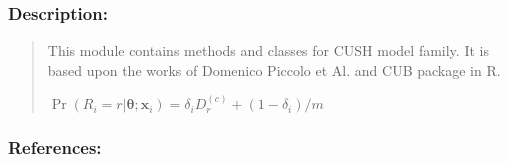 \documentclass[letterpaper,10pt,english]{sphinxmanual}
\begin{document}
\subsubsection{Description:}
\label{\detokenize{cubmods:id202}}\begin{quote}

\sphinxAtStartPar
This module contains methods and classes
for CUSH model family.
It is based upon the works of Domenico
Piccolo et Al. and CUB package in R.

\sphinxAtStartPar
\(\Pr(R_i=r|\pmb \theta; \pmb x_i) = \delta_i D_{r}^{(c)} + (1 - \delta_i)/m\)
\end{quote}


\subsubsection{References:}
\end{document}
